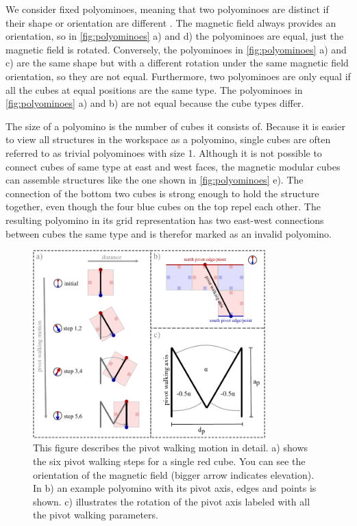 We consider fixed polyominoes, meaning that two polyominoes are distinct if their shape or orientation are different \cite{Lu2021}.
The magnetic field always provides an orientation, so in \autoref{fig:polyominoes} a) and d) the polyominoes are equal, just the magnetic field is rotated.
Conversely, the polyominoes in \autoref{fig:polyominoes} a) and c) are the same shape but with a different rotation under the same magnetic field orientation, so they are not equal.
Furthermore, two polyominoes are only equal if all the cubes at equal positions are the same type.
The polyominoes in \autoref{fig:polyominoes} a) and b) are not equal because the cube types differ.

The size of a polyomino is the number of cubes it consists of.
Because it is easier to view all structures in the workspace as a polyomino, single cubes are often referred to as trivial polyominoes with size 1.
Although it is not possible to connect cubes of same type at east and west faces, the magnetic modular cubes can assemble structures like the one shown in \autoref{fig:polyominoes} e).
The connection of the bottom two cubes is strong enough to hold the structure together, even though the four blue cubes on the top repel each other.
The resulting polyomino in its grid representation has two east-west connections between cubes the same type and is therefor marked as an invalid polyomino.


\begin{figure}
	\centering
	\includegraphics[width=0.80\textwidth]{figures/pivot_walking.pdf}
	\caption[Illustration of the pivot walking motion]{This figure describes the pivot walking motion in detail. a) shows the six pivot walking steps for a single red cube. You can see the orientation of the magnetic field (bigger arrow indicates elevation). In b) an example polyomino with its pivot axis, edges and points is shown. c) illustrates the rotation of the pivot axis labeled with all the pivot walking parameters.}
	\label{fig:pivot_walking}
\end{figure}

